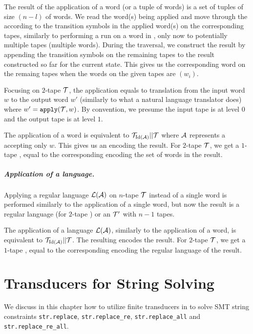The result of the application of a word (or a tuple of words) is a set of tuples of size $(n - l)$ of words.
We read the word(s) being applied and move through the \nft according to the transition symbols in the applied word(s) on the corresponding tapes, similarly to performing a run on a word in \nfa, only now to potentially multiple tapes (multiple words).
During the traversal, we construct the result by appending the transition symbols on the remaining tapes to the result constructed so far for the current state.
This gives us the corresponding word on the remaing tapes when the words on the given tapes are $(w_i)$.

Focusing on $2$-tape \nfts $\mathcal{T}$, the application equals to translation from the input word $w$ to the output word $w'$ (similarly to what a natural language translator does) where $w' = \texttt{apply}(\mathcal{T}, w)$.
By convention, we presume the input tape is at level $0$ and the output tape is at level $1$.

The application of a word is equivalent to $\mathcal{T}_{\text{Id}(\mathcal{A})} || \mathcal{T}$ where $\mathcal{A}$ represents a \dfa accepting only $w$.
This gives us an \nft encoding the result.
For $2$-tape $\mathcal{T}$, we get a $1$-tape \nft, equal to the corresponding \nfa encoding the set of words in the result.

\paragraph{Application of a language.}
Applying a regular language $\mathcal{L}(\mathcal{A})$ on $n$-tape \nft $\mathcal{T}$ instead of a single word is performed similarly to the application of a single word, but now the result is a regular language (for $2$-tape \nfts) or an \nft $\mathcal{T}'$ with $n-1$ tapes.

The application of a language $\mathcal{L}(\mathcal{A})$, similarly to the application of a word, is equivalent to $\mathcal{T}_{\text{Id}(\mathcal{A})} || \mathcal{T}$.
The resulting \nft encodes the result.
For $2$-tape $\mathcal{T}$, we get a $1$-tape \nft, equal to the corresponding \nfa encoding the regular language of the result.

\chapter{Transducers for String Solving}

We discuss in this chapter how to utilize finite transducers in \noodler to solve SMT string constraints \texttt{str.replace}, \texttt{str.replace\_re}, \texttt{str.replace\_all} and\\\texttt{str.replace\_re\_all}.

